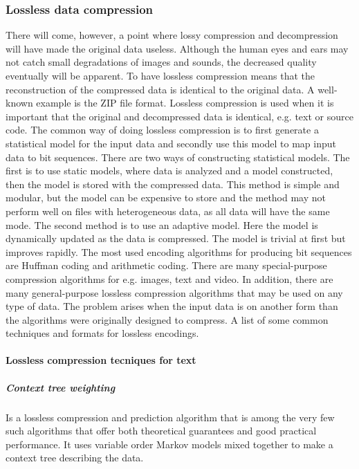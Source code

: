\subsubsection{Lossless data compression}
There will come, however, a point where lossy compression and decompression will have made the original data useless. Although the human eyes and ears may not catch small degradations of images and sounds, the decreased quality eventually will be apparent.
\newline
\newline
To have lossless compression means that the reconstruction of the compressed data is identical to the original data. A well-known example is the ZIP file format. Lossless compression is used when it is important that the original and decompressed data is identical, e.g. text or source code. The common way of doing lossless compression is to first generate a statistical model for the input data and secondly use this model to map input data to bit sequences. There are two ways of constructing statistical models. The first is to use static models, where data is analyzed and a model constructed, then the model is stored with the compressed data. This method is simple and modular, but the model can be expensive to store and the method may not perform well on files with heterogeneous data, as all data will have the same mode. The second method is to use an adaptive model. Here the model is dynamically updated as the data is compressed. The model is trivial at first but improves rapidly.
\newline
\newline
The most used encoding algorithms for producing bit sequences are Huffman coding and arithmetic coding. There are many special-purpose compression algorithms for e.g. images, text and video. In addition, there are many general-purpose lossless compression algorithms that may be used on any type of data. The problem arises when the input data is on another form than the algorithms were originally designed to compress.
A list of some common techniques and formats for lossless encodings. \cite{bib:losslessCompression}


\paragraph{Lossless compression tecniques for text}

\subparagraph{Context tree weighting} \hfill
\newline
Is a lossless compression and prediction algorithm that is among the very few such algorithms that offer both theoretical guarantees and good practical performance. It uses variable order Markov models mixed together to make a context tree describing the data. \cite{bib:contextTreeWeighting} \cite{bib:contextTreeWeightingResearch}


